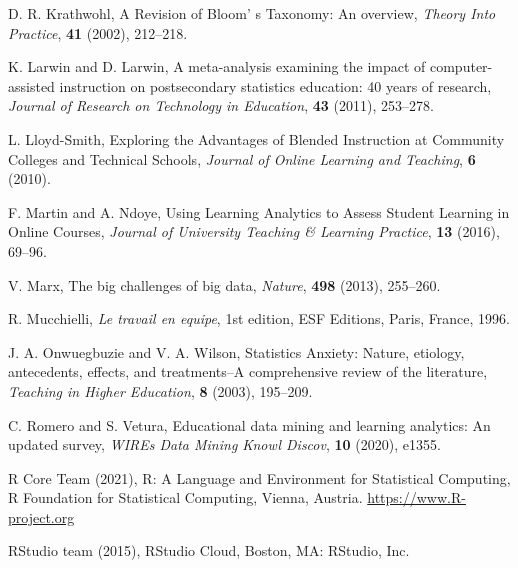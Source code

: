 \documentclass{aims} %
\theoremstyle{definition}
\begin{document}
\begin{thebibliography}{99}
     \newblock  D. R. Krathwohl,
     \newblock A Revision of Bloom' s Taxonomy: An overview,
     \newblock \emph{Theory Into Practice}, \textbf{41} (2002), 212--218.

     \newblock  K. Larwin and D. Larwin,
     \newblock A meta-analysis examining the impact of computer-assisted instruction on postsecondary statistics education: 40 years of research,
     \newblock \emph{Journal of Research on Technology in Education}, \textbf{43} (2011), 253--278.

     \newblock  L. Lloyd-Smith,
     \newblock Exploring the Advantages of Blended Instruction at Community Colleges and Technical Schools,
     \newblock \emph{Journal of Online Learning and Teaching}, \textbf{6} (2010).

     \newblock  F. Martin and A. Ndoye,
     \newblock Using Learning Analytics to Assess Student Learning in Online Courses,
     \newblock \emph{Journal of University Teaching \& Learning Practice}, \textbf{13} (2016), 69--96.

     \newblock  V. Marx,
     \newblock The big challenges of big data,
     \newblock \emph{Nature}, \textbf{498} (2013), 255--260.

     \newblock R. Mucchielli,
     \newblock \emph{Le travail en equipe},
     \newblock 1st edition, ESF Editions, Paris, France, 1996.

     \newblock J. A. Onwuegbuzie  and V. A. Wilson,
     \newblock Statistics Anxiety: Nature, etiology, antecedents, effects, and treatments--A comprehensive review of the literature,
     \newblock \emph{Teaching in Higher Education}, \textbf{8} (2003), 195--209.

     \newblock C. Romero and S. Vetura,
     \newblock Educational data mining and learning analytics: An updated survey,
     \newblock \emph{WIREs Data Mining Knowl Discov}, \textbf{10} (2020), e1355.

     \newblock R Core Team (2021),
     \newblock R: A Language and Environment for Statistical Computing,
     \newblock R Foundation for
  Statistical Computing, Vienna, Austria. \url{
  https://www.R-project.org}

     \newblock RStudio team (2015),
     \newblock RStudio Cloud,
     \newblock Boston, MA: RStudio, Inc.


\end{thebibliography}
\end{document}

